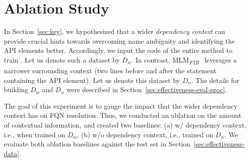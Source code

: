 \section{Ablation Study}
\label{sec:ablation}

In Section~\ref{sec:key}, we hypothesized that a wider {\em dependency
  context} can provide crucial hints towards overcoming name ambiguity
and identifying the API elements better. Accordingly, we input the
code of the entire method to train {\tool}. Let us denote such a
dataset by $D_w$. In contrast,
MLM\textsubscript{\textit{FIB}}~\cite{prompt-ase22} leverages a
narrower surrounding context (two lines before and after the statement
containing the API element). Let us denote this dataset by $D_n$. The
details for building $D_w$ and $D_n$ were described in
Section~\ref{sec:effectiveness-eval-proc}.

The goal of this experiment is to gauge the impact that the wider
dependency context has on FQN resolution. Thus, we conducted an
ablation on the amount of contextual information, and created two
baselines: (a) \tool w/ dependency context, i.e., when trained on
$D_w$, (b) \tool w/o dependency context, i.e., trained on $D_n$. We
evaluate both ablation baselines against the test set in
Section~\ref{sec:effectiveness-data}.


